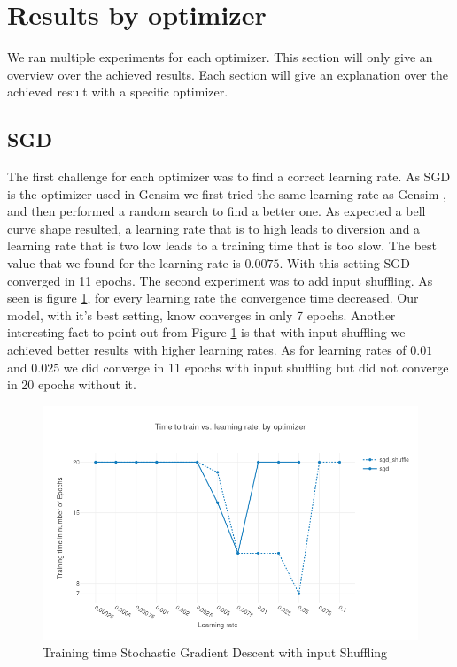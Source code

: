 \section{Results by optimizer}
We ran multiple experiments for each optimizer. This section will only give an overview over the achieved results. Each section will give an explanation over the achieved result with a specific optimizer.

\subsection{SGD}
The first challenge for each optimizer was to find a correct learning rate. As SGD is the optimizer used in Gensim \cite{gensim} we first tried the same learning rate as Gensim \cite{gensim}, and then performed a random search to find a better one. As expected a bell curve shape resulted, a learning rate that is to high leads to diversion and  a learning rate that is two low leads to a training time that is too slow. The best value that we found for the learning rate is $0.0075$. With this setting SGD converged in 11 epochs. The second experiment was to add input shuffling. 
As seen is figure \ref{fig:results_sgd}, for every learning rate the convergence time decreased. Our model, with it's best setting, know converges in only 7 epochs. Another interesting  fact to point out from Figure \ref{fig:results_sgd} is that with input shuffling we achieved better results with higher learning rates. As for learning rates of $0.01$ and $0.025$ we did converge in 11 epochs with input shuffling but did not converge in 20 epochs without it.

\begin{figure}[h]
    \centering
			\includegraphics[scale=0.45]{images/results_sgd_shuffle} 
    \caption{Training time Stochastic Gradient Descent with input Shuffling}
    \label{fig:results_sgd}
\end{figure}
